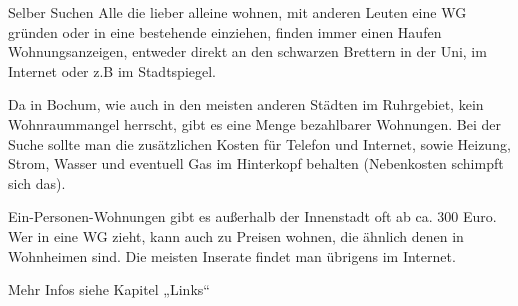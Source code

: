 Selber Suchen
Alle die lieber alleine wohnen, mit anderen Leuten eine WG gründen oder in eine bestehende einziehen, finden immer einen Haufen Wohnungsanzeigen, entweder direkt an den schwarzen Brettern in der Uni, im Internet oder z.B im Stadtspiegel.

Da in Bochum, wie auch in den meisten anderen Städten im Ruhrgebiet, kein Wohnraummangel herrscht, gibt es eine Menge bezahlbarer Wohnungen. Bei der Suche sollte man die zusätzlichen Kosten für Telefon und Internet, sowie Heizung, Strom, Wasser und eventuell Gas im Hinterkopf behalten (Nebenkosten schimpft sich das).

Ein-Personen-Wohnungen gibt es außerhalb der Innenstadt oft ab ca. 300 Euro. Wer in eine WG zieht, kann auch zu Preisen wohnen, die ähnlich denen in Wohnheimen sind. Die meisten Inserate findet man übrigens im Internet.

Mehr Infos siehe Kapitel „Links“